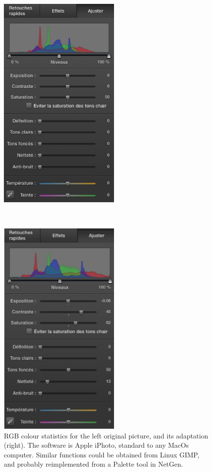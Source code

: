 \begin{figure}[hbtp]
\begin{center}
\leavevmode 
\begin{minipage}{6cm}
\begin{center} 
\includegraphics[width=6cm]{senegalColours.png} 
\end{center}
\end{minipage}~~~~~~~~~\begin{minipage}{6cm}
\begin{center} 
\includegraphics[width=6cm]{senegalColours2.png} 
\end{center}
\end{minipage}
\caption{RGB colour statistics for the left original picture, and its adaptation (right). The software
is Apple iPhoto, standard to any MacOs computer. Similar functions could be obtained from Linux GIMP,
and probably reimplemented from a Palette tool in NetGen.}
\label{fig:colours1+2}
\end{center}
\end{figure}
  
